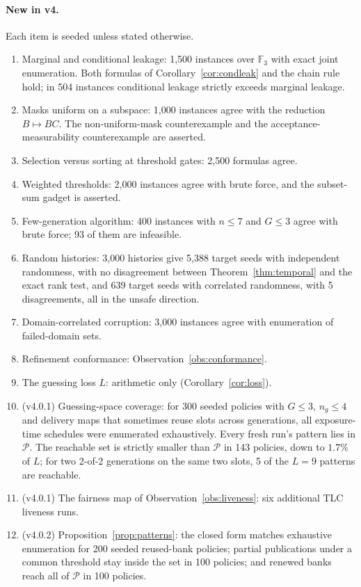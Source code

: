 \documentclass[pdflatex,sn-mathphys-num,twocolumn]{sn-jnl}
\theoremstyle{plain}
\theoremstyle{definition}
\newcommand{\F}{\mathbb{F}}
\begin{document}
\paragraph{New in v4.}
Each item is seeded unless stated otherwise.
\begin{enumerate}
\item Marginal and conditional leakage: 1,500 instances over $\F_3$ with exact joint enumeration. Both formulas of Corollary~\ref{cor:condleak} and the chain rule hold; in 504 instances conditional leakage strictly exceeds marginal leakage.
\item Masks uniform on a subspace: 1,000 instances agree with the reduction $B\mapsto BC$. The non-uniform-mask counterexample and the acceptance-measurability counterexample are asserted.
\item Selection versus sorting at threshold gates: 2,500 formulas agree.
\item Weighted thresholds: 2,000 instances agree with brute force, and the subset-sum gadget is asserted.
\item Few-generation algorithm: 400 instances with $n\le7$ and $G\le3$ agree with brute force; 93 of them are infeasible.
\item Random histories: 3,000 histories give 5,388 target seeds with independent randomness, with no disagreement between Theorem~\ref{thm:temporal} and the exact rank test, and 639 target seeds with correlated randomness, with 5 disagreements, all in the unsafe direction.
\item Domain-correlated corruption: 3,000 instances agree with enumeration of failed-domain sets.
\item Refinement conformance: Observation~\ref{obs:conformance}.
\item The guessing loss $L$: arithmetic only (Corollary~\ref{cor:loss}).
\item (v4.0.1) Guessing-space coverage: for 300 seeded policies with $G\le3$, $n_g\le4$ and delivery maps that sometimes reuse slots across generations, all exposure-time schedules were enumerated exhaustively. Every fresh run's pattern lies in $\mathcal P$. The reachable set is strictly smaller than $\mathcal P$ in 143 policies, down to $1.7\%$ of $L$; for two 2-of-2 generations on the same two slots, 5 of the $L=9$ patterns are reachable.
\item (v4.0.1) The fairness map of Observation~\ref{obs:liveness}: six additional TLC liveness runs.
\item (v4.0.2) Proposition~\ref{prop:patterns}: the closed form matches exhaustive enumeration for 200 seeded reused-bank policies; partial publications under a common threshold stay inside the set in 100 policies; and renewed banks reach all of $\mathcal P$ in 100 policies.

\end{enumerate}
\end{document}
